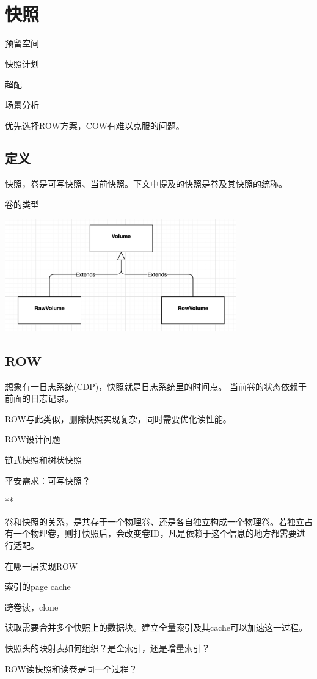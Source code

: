 \chapter{快照}

预留空间

快照计划

超配

场景分析

优先选择ROW方案，COW有难以克服的问题。

\section{定义}

快照，卷是可写快照、当前快照。下文中提及的快照是卷及其快照的统称。

卷的类型
\begin{center}
\includegraphics[width=10cm]{../imgs/volume-type.png}
\end{center}

\section{ROW}

想象有一日志系统(CDP)，快照就是日志系统里的时间点。
当前卷的状态依赖于前面的日志记录。

ROW与此类似，删除快照实现复杂，同时需要优化读性能。

ROW设计问题
\begin{enumbox}
\item 链式快照和树状快照
\item 平安需求：可写快照？
\item ***
\item 卷和快照的关系，是共存于一个物理卷、还是各自独立构成一个物理卷。若独立占有一个物理卷，则打快照后，会改变卷ID，凡是依赖于这个信息的地方都需要进行适配。
\item 在哪一层实现ROW
\item 索引的page cache
\item 跨卷读，clone
\item 读取需要合并多个快照上的数据块。建立全量索引及其cache可以加速这一过程。
\item 快照头的映射表如何组织？是全索引，还是增量索引？
\item ROW读快照和读卷是同一个过程？
\end{enumbox}

